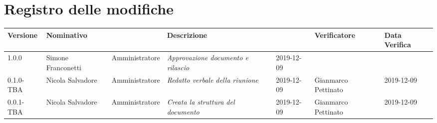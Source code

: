 \section*{Registro delle modifiche}
\renewcommand{\arraystretch}{1.8}
  \setlength\LTleft{-1.7cm}
  \begin{longtable}{|p{1.7cm}|p{2cm}|p{2.5cm}|p{3cm}|p{1.7cm}|p{2cm}|p{2.3cm}|}
    \hline
    \rowcolor{header}
    \textbf{Versione} & \textbf{Nominativo} & \centering{\textbf{Ruolo}} & \textbf{Descrizione} &      \centering{\textbf{Data}} & \textbf{Verificatore} & \textbf{Data Verifica} \\
    \hline
    1.0.0 & Simone Franconetti & Amministratore & \small{\textit{Approvazione documento e rilascio}} & 2019-12-09 & & \\
    0.1.0-TBA & Nicola Salvadore & Amministratore & \small{\textit{Redatto verbale della riunione}} & 2019-12-09 & Gianmarco Pettinato & 2019-12-09 \\
    0.0.1-TBA & Nicola Salvadore & Amministratore & \small{\textit{Creata la struttura del documento}} & 2019-12-09 & Gianmarco Pettinato & 2019-12-09 \\

    \hline
  \end{longtable}
  \setlength\LTleft{0cm}
